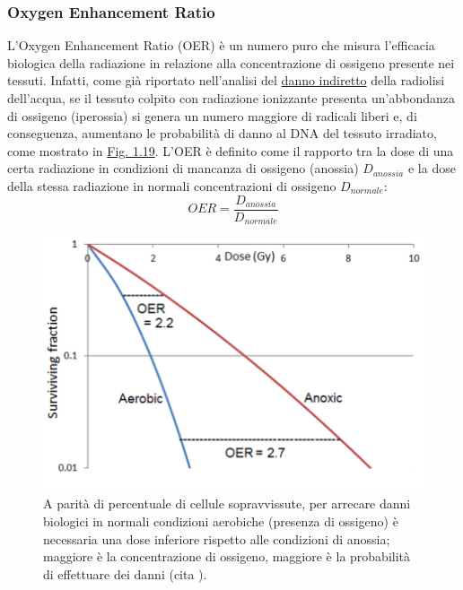 \documentclass[12pt,a4paper,twoside]{report}
\begin{document}
	\subsubsection{Oxygen Enhancement Ratio}\label{par:oer}
	L'Oxygen Enhancement Ratio (OER) è un numero puro che misura l'efficacia biologica della radiazione in relazione alla concentrazione di ossigeno presente nei tessuti. Infatti, come già riportato nell'analisi del \hyperref[par:danno_indiretto]{danno indiretto} della radiolisi dell'acqua, se il tessuto colpito con radiazione ionizzante presenta un'abbondanza di ossigeno (iperossia) si genera un numero maggiore di radicali liberi e, di conseguenza, aumentano le probabilità di danno al DNA del tessuto irradiato, come mostrato in \hyperref[fig:oer_survival]{Fig. 1.19}. L'OER è definito come il rapporto tra la dose di una certa radiazione in condizioni di mancanza di ossigeno (anossia) $D_{anossia}$ e la dose della stessa radiazione in normali concentrazioni di ossigeno $D_{normale}$:
	\begin{equation}
		OER=\frac{D_{anossia}}{D_{normale}}
		\label{eq:oer}
	\end{equation}
	\begin{figure}[H]
		\centering
		\includegraphics[width=0.9\linewidth]{oer_survival.png}
		\caption{A parità di percentuale di cellule sopravvissute, per arrecare danni biologici in normali condizioni aerobiche (presenza di ossigeno) è necessaria una dose inferiore rispetto alle condizioni di anossia; maggiore è la concentrazione di ossigeno, maggiore è la probabilità di effettuare dei danni (cita
			).}
		\label{fig:oer_survival}
	\end{figure}
\end{document}
